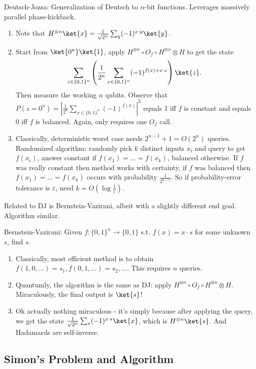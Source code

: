 Deutsch-Jozsa: Generalization of Deutsch to $n$-bit functions. Leverages massively parallel phase-kickback.
\begin{enumerate}
    \item Note that $H^{\otimes n}\ket{x}=\frac{1}{\sqrt{2^n}}\sum_{y}(-1)^{x\cdot y}\ket{y}$.
    \item Start from $\ket{0^n}\ket{1}$, apply $H^{\otimes n} \circ O_f \circ H^{\otimes n}\otimes H$ to get the state
    \begin{align*}
        \sum_{z \in \{0,1\}^n} \left( \frac{1}{2^n} \sum_{x \in \{0,1\}^n} (-1)^{f(x)+x \cdot z} \right) \ket{z}.
    \end{align*}
    Then measure the working $n$ qubits. Observe that $P(z=0^n) = |\frac{1}{2^n} \sum_{x \in \{0,1\}^n} (-1)^{f(x)}|^2$ equals 1 iff $f$ is constant and equals 0 iff $f$ is balanced. Again, only requires one $O_f$ call.
    \item Classically, deterministic worst case needs $2^{n-1}+1=O(2^n)$ queries. Randomized algorithm: randomly pick $k$ distinct inputs $x_i$ and query to get $f(x_i)$, answer constant if $f(x_1)=\dots=f(x_k)$, balanced otherwise. If $f$ was really constant then method works with certainty, if $f$ was balanced then $f(x_1)=\dots=f(x_k)$ occurs with probability $\frac{1}{2^{k-1}}$. So if probability-error tolerance is $\varepsilon$, need $k=O(\log \frac{1}{\varepsilon})$.
\end{enumerate}

Related to DJ is Bernstein-Vazirani, albeit with a slightly different end goal. Algorithm similar.

Bernstein-Vazirani: Given $f: \{0,1\}^n \rightarrow \{0,1\}$ s.t. $f(x)=x \cdot s$ for some unknown $s$, find $s$.
\begin{enumerate}
    \item Classically, most efficient method is to obtain $f(1,0,\dots)=s_1, f(0,1,\dots)=s_2, \dots$. This requires $n$ queries.
    \item Quantumly, the algorithm is the same as DJ: apply $H^{\otimes n} \circ O_f \circ H^{\otimes n}\otimes H$. Miraculously, the final output is $\ket{s}$!
    \item Ok actually nothing miraculous - it's simply because after applying the query, we get the state $\frac{1}{\sqrt{2^n}} \sum_x (-1)^{x \cdot s} \ket{x}$, which is $H^{\otimes n}\ket{s}$. And Hadamards are self-inverse.
\end{enumerate}

\subsection{Simon's Problem and Algorithm}

